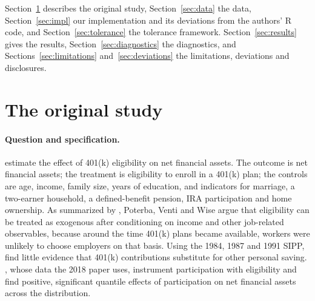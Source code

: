 \documentclass[11pt]{article}
\begin{document}
Section~\ref{sec:original} describes the original study, Section~\ref{sec:data} the data,
Section~\ref{sec:impl} our implementation and its deviations from the authors' R code,
and Section~\ref{sec:tolerance} the tolerance framework. Section~\ref{sec:results} gives
the results, Section~\ref{sec:diagnostics} the diagnostics, and
Sections~\ref{sec:limitations} and~\ref{sec:deviations} the limitations, deviations and
disclosures.

\section{The original study}
\label{sec:original}

\paragraph{Question and specification.} \citet{chernozhukov2018dml} estimate the effect
of 401(k) eligibility on net financial assets. The outcome is net financial assets; the
treatment is eligibility to enroll in a 401(k) plan; the controls are age, income,
family size, years of education, and indicators for marriage, a two-earner household, a
defined-benefit pension, IRA participation and home ownership. As summarized by
\citet{chernozhukov2018dml}, Poterba, Venti and Wise argue that eligibility can be
treated as exogenous after conditioning on income and other job-related observables,
because around the time 401(k) plans became available, workers were unlikely to choose
employers on that basis. Using the 1984, 1987 and 1991 SIPP, \citet{poterba1995} find
little evidence that 401(k) contributions substitute for other personal saving.
\citet{chernozhukov2004}, whose data the 2018 paper uses, instrument participation with
eligibility and find positive, significant quantile effects of participation on net
financial assets across the distribution.
\end{document}

